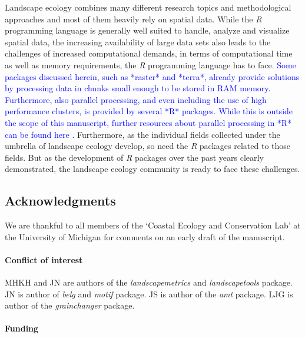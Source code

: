 \documentclass[smallextended]{svjour3}       %
\begin{document}
Landscape ecology combines many different research topics and methodological approaches and most of them heavily rely on spatial data.
While the \emph{R} programming language is generally well suited to handle, analyze and visualize spatial data, the increasing availability of large data sets also leads to the challenges of increased computational demands, in terms of computational time as well as memory requirements, the \emph{R} programming language has to face.
\textcolor{blue}{Some packages discussed herein, such as *raster* and *terra*, already provide solutions by processing data in chunks small enough to be stored in RAM memory.
Furthermore, also parallel processing, and even including the use of high performance clusters, is provided by several *R* packages. 
While this is outside the scope of this manuscript, further resources about parallel processing in *R* can be found here \cite{Bengtsson2020,Schubert2019,McCallum2012}.}
Furthermore, as the individual fields collected under the umbrella of landscape ecology develop, so need the \emph{R} packages related to those fields.
But as the development of \emph{R} packages over the past years clearly demonstrated, the landscape ecology community is ready to face these challenges.

\FloatBarrier

\hypertarget{acknowledgments}{%
\subsection{Acknowledgments}\label{acknowledgments}}

We are thankful to all members of the `Coastal Ecology and Conservation Lab' at the University of Michigan for comments on an early draft of the manuscript.

\hypertarget{conflict-of-interest}{%
\paragraph{Conflict of interest}\label{conflict-of-interest}}

MHKH and JN are authors of the \emph{landscapemetrics} and \emph{landscapetools} package.
JN is author of \emph{belg} and \emph{motif} package. JS is author of the \emph{amt} package. LJG is author of the \emph{grainchanger} package.

\hypertarget{funding}{%
\paragraph{Funding}\label{funding}}
\end{document}
